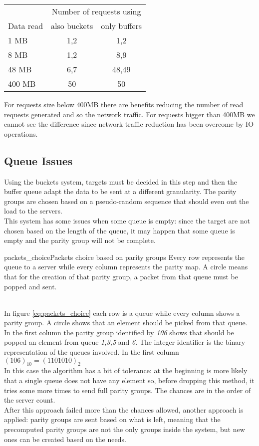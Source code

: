 \vspace{0.5cm}
\begin{tabular}{l | c | c}
    & \multicolumn{2}{|c}{Number of requests using} \\
    Data read & also buckets & only buffers \\ \hline
    1 MB & 1,2 & 1,2 \\
    8 MB & 1,2 & 8,9 \\
    48 MB& 6,7 & 48,49 \\
    400 MB & 50 & 50 \\
\end{tabular}
\vspace{0.5cm}

For requests size below 400MB there are benefits reducing the number of read
requests generated and so the network traffic. For requests bigger than 400MB
we cannot see the difference since network traffic reduction has been overcome
by IO operations.

\subsection{Queue Issues}
Using the buckets system, targets must be decided in this step and then the
buffer queue adapt the data to be sent at a different granularity.
The parity groups are chosen based on a pseudo-random sequence that should
even out the load to the servers. \\
This system has some issues when some queue is empty: since the target are
not chosen based on the length of the queue, it may happen that some queue is
empty and the parity group will not be complete. \\

\begin{myimage}{packets_choice}{Packets choice based on parity groups}
    Every row represents the queue to a server while every column represents the
    parity map. A circle means that for the creation of that parity group, a
    packet from that queue must be popped and sent.
\end{myimage} \\
In figure \ref{eq:packets_choice} each row is a queue while every column shows a parity group.
A circle shows that an element should be picked from that queue. \\
In the first column the parity group identified by \textit{106} shows that
should be popped an element from queue \textit{1,3,5} and \textit{6}. The
integer identifier is the binary representation of the queues involved. In the
first column $(106)_{10} = (1101010)_2$ \\
In this case the algorithm has a bit of tolerance: at the beginning is more
likely that a single queue does not have any element so, before dropping this
method, it tries some more times to send full parity groups. The chances are in
the order of the server count. \\
After this approach failed more than the chances allowed, another approach is applied:
parity groups are sent based on what is left, meaning that the precomputed
parity groups are not the only groups inside the system, but new ones can be
created based on the needs.\\

